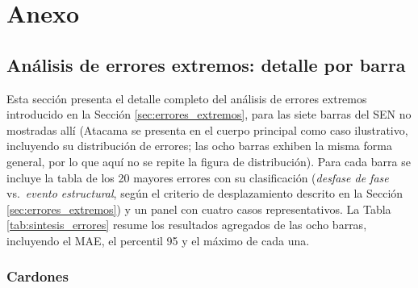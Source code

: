 \chapter{Anexo}

\section{Análisis de errores extremos: detalle por barra}
\label{anexo:errores_extremos}

Esta sección presenta el detalle completo del análisis de errores extremos introducido en la Sección \ref{sec:errores_extremos}, para las siete barras del SEN no mostradas allí (Atacama se presenta en el cuerpo principal como caso ilustrativo, incluyendo su distribución de errores; las ocho barras exhiben la misma forma general, por lo que aquí no se repite la figura de distribución). Para cada barra se incluye la tabla de los 20 mayores errores con su clasificación (\textit{desfase de fase} vs.\ \textit{evento estructural}, según el criterio de desplazamiento descrito en la Sección \ref{sec:errores_extremos}) y un panel con cuatro casos representativos. La Tabla \ref{tab:sintesis_errores} resume los resultados agregados de las ocho barras, incluyendo el MAE, el percentil 95 y el máximo de cada una.

\subsection{Cardones}

